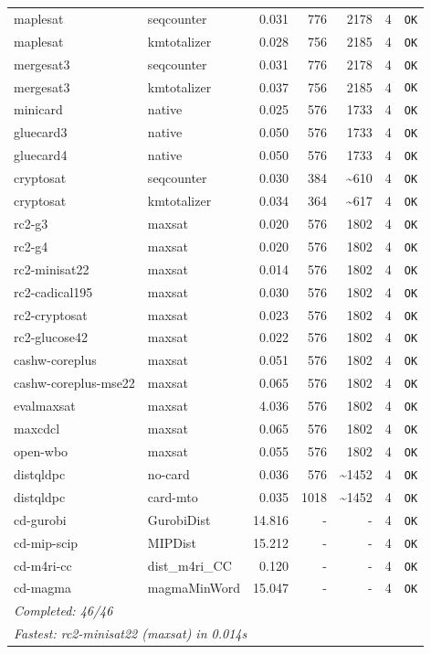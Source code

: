 \begin{longtable}{llrrrl p{}}
maplesat & seqcounter & 0.031 & 776 & 2178 & 4 & \texttt{OK} \\
maplesat & kmtotalizer & 0.028 & 756 & 2185 & 4 & \texttt{OK} \\
mergesat3 & seqcounter & 0.031 & 776 & 2178 & 4 & \texttt{OK} \\
mergesat3 & kmtotalizer & 0.037 & 756 & 2185 & 4 & \texttt{OK} \\
minicard & native & 0.025 & 576 & 1733 & 4 & \texttt{OK} \\
gluecard3 & native & 0.050 & 576 & 1733 & 4 & \texttt{OK} \\
gluecard4 & native & 0.050 & 576 & 1733 & 4 & \texttt{OK} \\
cryptosat & seqcounter & 0.030 & 384 & \textasciitilde{}610 & 4 & \texttt{OK} \\
cryptosat & kmtotalizer & 0.034 & 364 & \textasciitilde{}617 & 4 & \texttt{OK} \\
rc2-g3 & maxsat & 0.020 & 576 & 1802 & 4 & \texttt{OK} \\
rc2-g4 & maxsat & 0.020 & 576 & 1802 & 4 & \texttt{OK} \\
rc2-minisat22 & maxsat & 0.014 & 576 & 1802 & 4 & \texttt{OK} \\
rc2-cadical195 & maxsat & 0.030 & 576 & 1802 & 4 & \texttt{OK} \\
rc2-cryptosat & maxsat & 0.023 & 576 & 1802 & 4 & \texttt{OK} \\
rc2-glucose42 & maxsat & 0.022 & 576 & 1802 & 4 & \texttt{OK} \\
cashw-coreplus & maxsat & 0.051 & 576 & 1802 & 4 & \texttt{OK} \\
cashw-coreplus-mse22 & maxsat & 0.065 & 576 & 1802 & 4 & \texttt{OK} \\
evalmaxsat & maxsat & 4.036 & 576 & 1802 & 4 & \texttt{OK} \\
maxcdcl & maxsat & 0.065 & 576 & 1802 & 4 & \texttt{OK} \\
open-wbo & maxsat & 0.055 & 576 & 1802 & 4 & \texttt{OK} \\
distqldpc & no-card & 0.036 & 576 & \textasciitilde{}1452 & 4 & \texttt{OK} \\
distqldpc & card-mto & 0.035 & 1018 & \textasciitilde{}1452 & 4 & \texttt{OK} \\
cd-gurobi & GurobiDist & 14.816 & - & - & 4 & \texttt{OK} \\
cd-mip-scip & MIPDist & 15.212 & - & - & 4 & \texttt{OK} \\
cd-m4ri-cc & dist\_m4ri\_CC & 0.120 & - & - & 4 & \texttt{OK} \\
cd-magma & magmaMinWord & 15.047 & - & - & 4 & \texttt{OK} \\
\midrule
\multicolumn{7}{l}{\textit{Completed: 46/46}} \\
\multicolumn{7}{l}{\textit{Fastest: rc2-minisat22 (maxsat) in 0.014s}} \\
\end{longtable}
